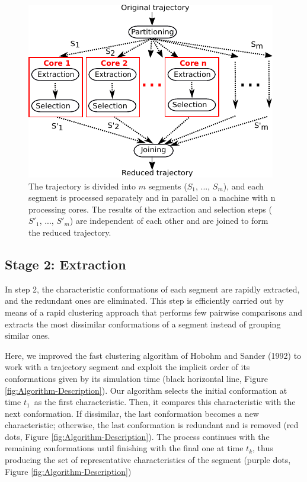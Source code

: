 \documentclass[twocolumn]{bmcart}%
\begin{document}
\begin{figure}[th]
\begin{centering}
\includegraphics{images/04-algorithm-description-parallel}
\par\end{centering}
\caption{ The trajectory is divided into $m$ segments ($S_{1}$, ..., $S_{m}$), and each segment is processed separately and in parallel on a machine with n processing cores. The results of the extraction and selection steps ($S'_{1}$, ..., $S'_{m}$) are independent of each other and are joined to form the reduced trajectory.\label{fig:Algorithm-Parallel}}
\end{figure}


\subsection*{Stage 2: Extraction}

In step 2, the characteristic conformations of each segment are rapidly extracted, and the redundant ones are eliminated. This step is efficiently carried out by means of a rapid clustering approach that performs few pairwise comparisons and extracts the most dissimilar conformations of a segment instead of grouping similar ones.

Here, we improved the fast clustering algorithm of Hobohm and Sander (1992) to work with a trajectory segment and exploit the implicit order of its conformations given by its simulation time (black horizontal line, Figure \ref{fig:Algorithm-Description}). Our algorithm selects the initial conformation at time $t_{1}$~as the first characteristic. Then, it compares this characteristic with the next conformation. If dissimilar, the last conformation becomes a new characteristic; otherwise, the last conformation is redundant and is removed (red dots, Figure \ref{fig:Algorithm-Description}). The process continues with the remaining conformations until finishing with the final one at time $t_{k}$, thus producing the set of representative characteristics of the segment (purple dots, Figure \ref{fig:Algorithm-Description})
\end{document}
